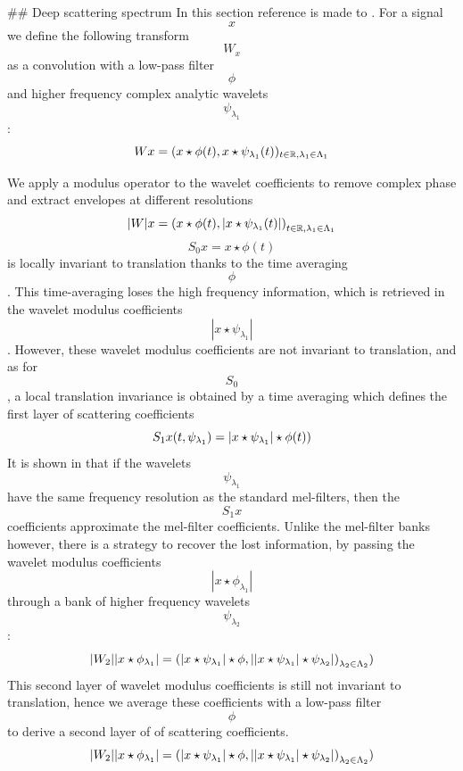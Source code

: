 ## Deep scattering spectrum
In this section reference is made to \citep{anden2011multiscale, anden2014deep, zeghidour2016deep}. For a signal $$x$$ we define the following transform $$W_x$$ as a convolution with a low-pass filter $$\phi$$ and higher frequency complex analytic wavelets $$\psi_{\lambda_1}$$:
\begin{equation}
$$Wx=(x\star\phi(t),x\star\psi_{\lambda_1}(t))_{t\in\mathbb{R},\lambda_1\in\Lambda_1}$$ \label{eqn_c4_dss01}
\end{equation}

We apply a modulus operator to the wavelet coefficients to remove complex phase and extract envelopes at different resolutions
\begin{equation}
$$|W|x=\left(x\star\phi(t),|x\star\psi_{\lambda_1}(t)|\right)_{t\in\mathbb{R},\lambda_1\in\Lambda_1}$$ \label{eqn_c4_dss02}
\end{equation}
$$S_0x=x\star\phi(t)$$ is locally invariant to translation thanks to the time averaging $$\phi$$.  This time-averaging loses the high frequency information, which is retrieved in the wavelet modulus coefficients $$|x\star\psi_{\lambda_1}|$$.  However, these wavelet modulus coefficients are not invariant to translation, and as for $$S_0$$, a local translation invariance is obtained by a time averaging which defines the first layer of scattering coefficients
\begin{equation}
$$S_1x(t,\psi_{\lambda_1})=|x \star\psi_{\lambda_1}| \star\phi(t)$$\label{eqn_c4_dss03})
\end{equation}
It is shown in \cite{anden2014deep} that if the wavelets $$\psi_{\lambda_1}$$ have the same frequency resolution as the standard mel-filters, then the $$S_1x$$ coefficients approximate the mel-filter coefficients.  Unlike the mel-filter banks however, there is a strategy to recover the lost information, by passing the wavelet modulus coefficients  $$|x\star\phi_{\lambda_1}|$$ through a bank of higher frequency wavelets $$\psi_{\lambda_2}$$:
\begin{equation}
$$|W_2||x\star\phi_{\lambda_1}|=\left(|x\star\psi_{\lambda_1}|\star\phi,||x\star\psi_{\lambda_1}|\star\psi_{\lambda_2}|\right)_{\lambda_2\in\Lambda_2}$$ \label{eqn_c4_dss04})
\end{equation}
This second layer of wavelet modulus coefficients is still not invariant to translation, hence we average these coefficients with a low-pass filter $$\phi$$ to derive a second layer of of scattering coefficients.
 \begin{equation}
$$|W_2||x\star\phi_{\lambda_1}|=\left(|x\star\psi_{\lambda_1}|\star\phi,||x\star\psi_{\lambda_1}|\star\psi_{\lambda_2}|\right)_{\lambda_2\in\Lambda_2}$$ \label{eqn_c4_dss04})
\end{equation}

